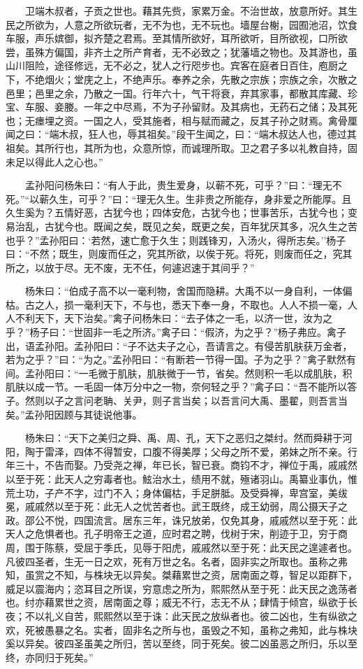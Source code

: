 　　卫端木叔者，子贡之世也。藉其先赀，家累万金。不治世故，放意所好。其生民之所欲为，人意之所欲玩者，无不为也，无不玩也。墙屋台榭，园囿池沼，饮食车服，声乐嫔御，拟齐楚之君焉。至其情所欲好，耳所欲听，目所欲视，口所欲尝，虽殊方偏国，非齐土之所产育者，无不必致之；犹藩墙之物也。及其游也，虽山川阻险，途径修远，无不必之，犹人之行咫步也。宾客在庭者日百住，庖厨之下，不绝烟火；堂庑之上，不绝声乐。奉养之余，先散之宗族；宗族之余，次散之邑里；邑里之余，乃散之一国。行年六十，气干将衰，弃其家事，都散其库藏、珍宝、车服、妾媵。一年之中尽焉，不为子孙留财。及其病也，无药石之储；及其死也；无瘗埋之资。一国之人，受其施者，相与赋而藏之，反其子孙之财焉。禽骨厘闻之曰：``端木叔，狂人也，辱其祖矣。''段干生闻之，曰：``端木叔达人也，德过其祖矣。其所行也，其所为也，众意所惊，而诚理所取。卫之君子多以礼教自持，固未足以得此人之心也。''

　　孟孙阳问杨朱曰：``有人于此，贵生爱身，以蕲不死，可乎？''曰：``理无不死。''``以蕲久生，可乎？''曰：``理无久生。生非贵之所能存，身非爱之所能厚。且久生奚为？五情好恶，古犹今也；四体安危，古犹今也；世事苦乐，古犹今也；变易治乱，古犹今也。既闻之矣，既见之矣，既更之矣，百年犹厌其多，况久生之苦也乎？''孟孙阳曰：`若然，速亡愈于久生；则践锋刃，入汤火，得所志矣。''杨子曰：``不然；既生，则废而任之，究其所欲，以俟于死。将死，则废而任之，究其所之，以放于尽。无不废，无不任，何遽迟速于其间乎？''

　　杨朱曰：``伯成子高不以一毫利物，舍国而隐耕。大禹不以一身自利，一体偏枯。古之人，损一毫利天下，不与也，悉天下奉一身，不取也。人人不损一毫，人人不利天下，天下治矣。''禽子问杨朱曰：``去子体之一毛，以济一世，汝为之乎？''杨子曰：``世固非一毛之所济。''禽子曰：``假济，为之乎？''杨子弗应。禽子出，语孟孙阳。孟孙阳曰：``子不达夫子之心，吾请言之。有侵苦肌肤获万金者，若为之乎？''曰：``为之。''孟孙阳曰：``有断若一节得一国。子为之乎？''禽子默然有间。孟孙阳曰：``一毛微于肌肤，肌肤微于一节，省矣。然则积一毛以成肌肤，积肌肤以成一节。一毛固一体万分中之一物，奈何轻之乎？''禽子曰：``吾不能所以答子。然则以子之言问老聃、关尹，则子言当矣；以吾言问大禹、墨翟，则吾言当矣。''孟孙阳因顾与其徒说他事。

　　杨朱曰：``天下之美归之舜、禹、周、孔，天下之恶归之桀纣。然而舜耕于河阳，陶于雷泽，四体不得暂安，口腹不得美厚；父母之所不爱，弟妹之所不亲。行年三十，不告而娶。乃受尧之禅，年已长，智已衰。商钧不才，禅位于禹，戚戚然以至于死：此天人之穷毒者也。鮌治水土，绩用不就，殛诸羽山。禹纂业事仇，惟荒土功，子产不字，过门不入；身体偏枯，手足胼胝。及受舜禅，卑宫室，美绂冕，戚戚然以至于死：此无人之忧苦者也。武王既终，成王幼弱，周公摄天子之政。邵公不悦，四国流言。居东三年，诛兄放弟，仅免其身，戚戚然以至于死：此天人之危惧者也。孔子明帝王之道，应时君之聘，伐树于宋，削迹于卫，穷于商周，围于陈蔡，受屈于季氏，见辱于阳虎，戚戚然以至于死：此天民之遑遽者也。凡彼四圣者，生无一日之欢，死有万世之名。名者，固非实之所取也。虽称之弗知，虽赏之不知，与株块无以异矣。桀藉累世之资，居南面之尊，智足以距群下，威足以震海内；恣耳目之所误，穷意虑之所为，熙熙然从至于死：此天民之逸荡者也。纣亦藉累世之资，居南面之尊；威无不行，志无不从；肆情于倾宫，纵欲于长夜；不以礼义自苦，熙熙然以至于诛：此天民之放纵者也。彼二凶也，生有纵欲之欢，死被愚暴之名。实者，固非名之所与也，虽毁之不知，虽称之弗知，此与株块奚以异矣。彼四圣虽美之所归，苦以至终，同于死矣。彼二凶虽恶之所归，乐以至终，亦同归于死矣。''

